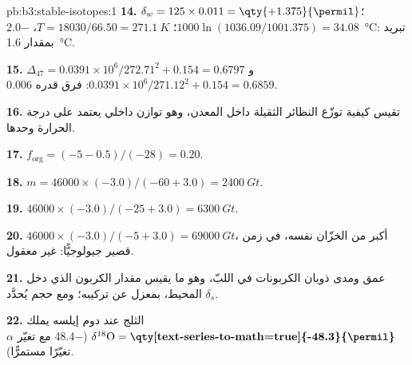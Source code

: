 \begin{solution}{pb:b3:stable-isotopes:1}
\textbf{14.} $\delta_w = 125\times0.011 = \qty{+1.375}{\permil}$؛ $1000\ln(1036.09/1001.375)
= 34.08$؛ $T = 18030/66.50 = \qty{271.1}{K}$، \qty{-2.0}{\celsius}: تبريد بمقدار
\qty{1.6}{\celsius}.

\textbf{15.} $\Delta_{47} = 0.0391\times10^6/272.71^2 + 0.154 = 0.6797$
و$0.0391\times10^6/271.12^2 + 0.154 = 0.6859$: فرق قدره
\qty{0.006}{\permil}.

\textbf{16.} تقيس كيفية توزّع النظائر الثقيلة داخل
المعدن، وهو توازن داخلي يعتمد على درجة الحرارة وحدها.

\textbf{17.} $f_{\mathrm{org}} = (-5 - 0.5)/(-28) = 0.20$.

\textbf{18.} $m = 46000\times(-3.0)/(-60 + 3.0) = \qty{2400}{Gt}$.

\textbf{19.} $46000\times(-3.0)/(-25 + 3.0) = \qty{6300}{Gt}$.

\textbf{20.} $46000\times(-3.0)/(-5 + 3.0) = \qty{69000}{Gt}$، أكبر من
الخزّان نفسه، في زمن قصير جيولوجيًّا: غير معقول.

\textbf{21.} عمق ومدى ذوبان الكربونات في اللبّ، وهو ما
يقيس مقدار الكربون الذي دخل المحيط، بمعزل عن تركيبه؛
ومع حجم  يُحدَّد $\delta_s$.

\textbf{22.} الثلج عند دوم إيلسه يملك $\delta^{18}\mathrm O =
\textbf{\qty[text-series-to-math=true]{-48.3}{\permil}}$ (\qty{-48.4}{\permil}
مع تغيّر $\alpha$ تغيّرًا مستمرًّا).
\end{solution}

